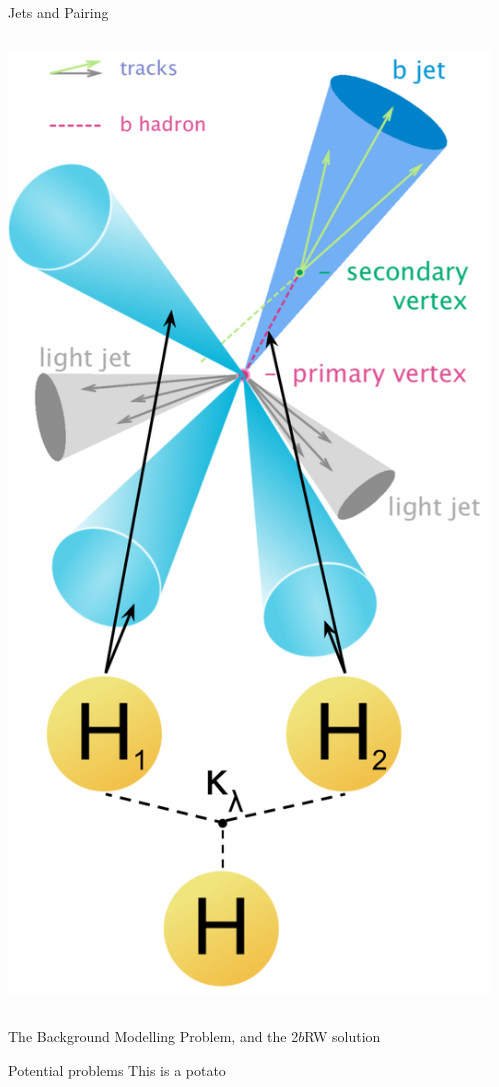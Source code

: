 \documentclass[10pt, aspectratio=169]{beamer}
\begin{document}
{\begin{frame}{Jets and Pairing}
\begin{columns}[onlytextwidth]
\begin{column}{0.25\textwidth}
      \includegraphics[width=\linewidth]{images/jets_and_pairing.png}
    \end{column}
​  \end{columns}
\end{frame}
}

\begin{frame}{The Background Modelling Problem, and the 2$b$RW solution}
  
  
  \begin{alertblock}{Potential problems}
		This is a potato
	\end{alertblock}
\end{frame}
\end{document}

